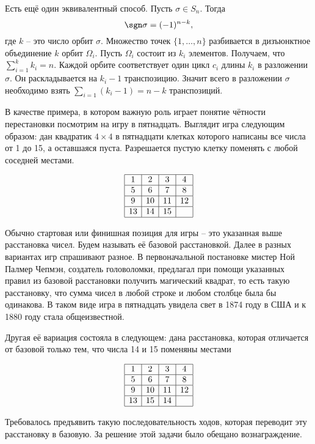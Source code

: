 Есть ещё один эквивалентный способ.
\utv Пусть $\sigma\in S_n$. Тогда
$$\sgn \sigma = (-1)^{n-k},$$
где $k$ -- это число орбит $\sigma$.
\eutv
\proof Множество точек $\{1,\dots,n\}$ разбивается в дизъюнктное объединение  $k$ орбит $\Omega_i$. Пусть $\Omega_i$ состоит из $k_i$ элементов. Получаем, что $\sum_{i=1}^{k} k_i=n$. Каждой орбите соответствует один цикл $c_i$ длины $k_i$ в разложении $\sigma$. Он раскладывается на $k_i-1$ транспозицию. Значит всего в разложении $\sigma$ необходимо взять $\sum_{i=1}(k_i-1)=n-k$ транспозиций. 
\endproof

В качестве примера, в котором важную роль играет понятие чётности перестановки посмотрим на игру в пятнадцать. Выглядит игра следующим образом: дан квадратик $4\times 4$ в пятнадцати клетках которого написаны все числа от 1 до 15, а оставшаяся пуста. Разрешается пустую клетку поменять с любой соседней местами.

$$\begin{array}{|c|c|c|c|}
\hline
1 & 2 & 3 & 4\\
\hline
5 & 6 & 7 & 8\\
\hline
9& 10& 11& 12\\
\hline
13& 14& 15&\\
\hline
\end{array}
$$

Обычно стартовая или финишная позиция для игры -- это указанная выше расстановка чисел. Будем называть её базовой расстановкой.
Далее в разных вариантах игр спрашивают разное. В первоначальной постановке мистер Ной Палмер Чепмэн, создатель головоломки, предлагал при помощи указанных правил из базовой расстановки получить магический квадрат, то есть такую расстановку, что сумма чисел в любой строке и любом столбце была бы одинакова. В таком виде игра в пятнадцать увидела свет в 1874 году в США и к 1880 году стала общеизвестной. 

Другая её вариация состояла в следующем: дана расстановка, которая отличается от базовой только тем, что числа 14 и 15 поменяны местами

$$\begin{array}{|c|c|c|c|}
\hline
1 & 2 & 3 & 4\\
\hline
5 & 6 & 7 & 8\\
\hline
9& 10& 11& 12\\
\hline
13& 15& 14&\\
\hline
\end{array}
$$

Требовалось предъявить такую последовательность ходов, которая переводит эту расстановку в базовую. За решение этой задачи было обещано вознаграждение.

